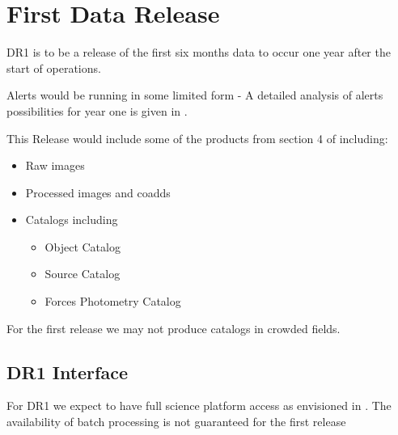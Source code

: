 \section{First Data Release } \label{sect:dr1}

DR1 is to be a release of the first six months data to occur one year after the start of operations.

Alerts would be running in some limited form - A detailed analysis of alerts possibilities for year one is given in .


This Release would include some of the products from section 4 of \DPDD including:

\begin{itemize}
\item  Raw images
\item  Processed images and coadds
\item  Catalogs including

\begin{itemize}
\item Object Catalog
\item Source Catalog
\item Forces Photometry Catalog
\end{itemize}

\end{itemize}

For the first release we may not produce catalogs in crowded fields.

\subsection {DR1 Interface}
For DR1 we expect to have full science platform access as envisioned in .
The availability of batch processing is not guaranteed for the first release
